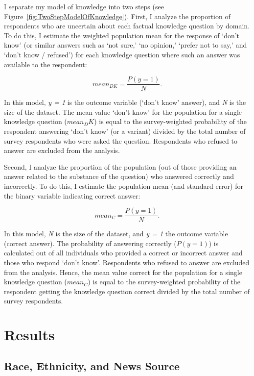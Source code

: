 \documentclass[11pt]{article}
\begin{document}
I separate my model of knowledge into two steps (see
Figure~\ref{fig:TwoStepModelOfKnowledge}). First, I analyze the proportion of
respondents who are uncertain about each factual knowledge
question by domain. To do this, I estimate the weighted population mean for the
response of `don't know' (or similar answers such as `not sure,' `no opinion,'
`prefer not to say,' and `don't know / refused') for each knowledge question
where such an answer was available to the respondent:

 $$ mean_{DK} = \frac{P(y = 1)}{N}. $$

In this model, \emph{y = 1} is the outcome variable (`don't know' answer), and
\emph{N} is the size of the dataset. The mean value `don't know' for the population for a single knowledge
question ($mean_DK$) is equal to the survey-weighted probability of the
respondent answering `don't know' (or a variant) divided by the total number of
survey respondents who were asked the question. Respondents who refused to answer are excluded from the analysis.

Second, I analyze the proportion of the population (out of those providing an answer related to the substance of the
question) who answered correctly and incorrectly. To do this, I estimate the
population mean (and standard error) for the binary variable indicating correct
answer:

 $$ mean_C = \frac{P(y = 1)}{N}. $$

In this model, \emph{N} is the size of the dataset, and \emph{y = 1} the outcome
variable (correct answer). The probability of answering correctly ($P(y = 1)$)
is calculated out of all individuals who provided a correct or incorrect answer and those who respond
`don't know'. Respondents who refused to answer are excluded from the analysis.
Hence, the mean value correct for the population for a single knowledge
question ($mean_C$) is equal to the survey-weighted probability of the
respondent getting the knowledge question correct divided by the total number of
survey respondents.










\hypertarget{results}{%
\section{Results}\label{sec:results}}
\hypertarget{race-news}{%
\subsection{Race, Ethnicity, and News Source}\label{sec:race-news}}
\end{document}
